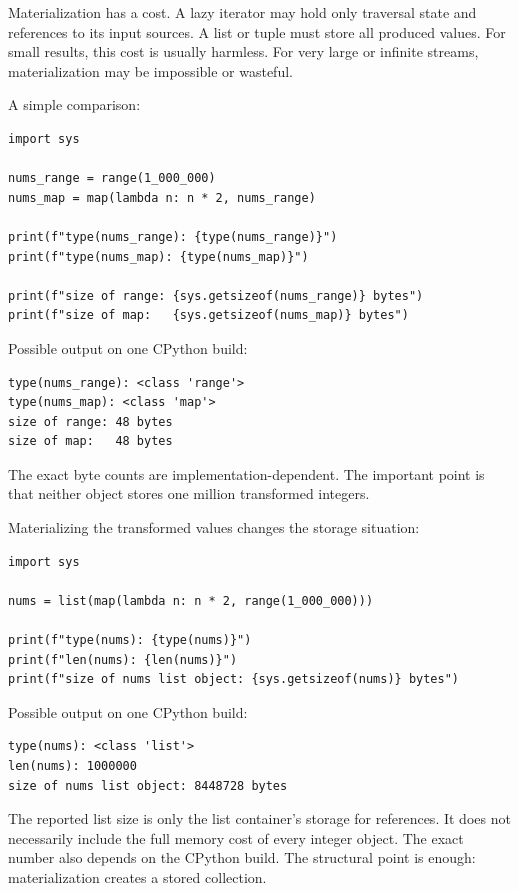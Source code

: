 Materialization has a cost. A lazy iterator may hold only traversal state and references to its input sources. A list or tuple must store all produced values. For small results, this cost is usually harmless. For very large or infinite streams, materialization may be impossible or wasteful.

A simple comparison:

\begin{verbatim}
import sys

nums_range = range(1_000_000)
nums_map = map(lambda n: n * 2, nums_range)

print(f"type(nums_range): {type(nums_range)}")
print(f"type(nums_map): {type(nums_map)}")

print(f"size of range: {sys.getsizeof(nums_range)} bytes")
print(f"size of map:   {sys.getsizeof(nums_map)} bytes")
\end{verbatim}

Possible output on one CPython build:

\begin{verbatim}
type(nums_range): <class 'range'>
type(nums_map): <class 'map'>
size of range: 48 bytes
size of map:   48 bytes
\end{verbatim}

The exact byte counts are implementation-dependent. The important point is that neither object stores one million transformed integers.

Materializing the transformed values changes the storage situation:

\begin{verbatim}
import sys

nums = list(map(lambda n: n * 2, range(1_000_000)))

print(f"type(nums): {type(nums)}")
print(f"len(nums): {len(nums)}")
print(f"size of nums list object: {sys.getsizeof(nums)} bytes")
\end{verbatim}

Possible output on one CPython build:

\begin{verbatim}
type(nums): <class 'list'>
len(nums): 1000000
size of nums list object: 8448728 bytes
\end{verbatim}

The reported list size is only the list container's storage for references. It does not necessarily include the full memory cost of every integer object. The exact number also depends on the CPython build. The structural point is enough: materialization creates a stored collection.


